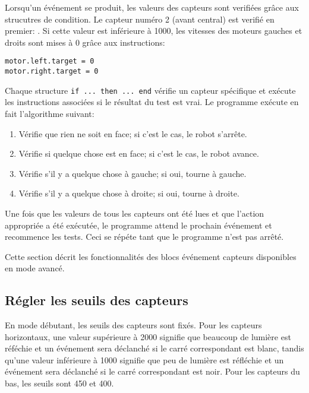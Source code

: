 Lorsqu'un événement se produit, les valeurs des capteurs sont verifiées grâce aux strucutres de condition.
Le capteur numéro 2 (avant central) est verifié en premier: .
Si cette valeur est inférieure à 1000, les vitesses des moteurs gauches et droits sont mises à 0
grâce aux instructions:

\begin{footnotesize}
\begin{verbatim}
motor.left.target = 0
motor.right.target = 0
\end{verbatim}
\end{footnotesize}

Chaque structure \verb+if ... then ... end+ vérifie un capteur spécifique et exécute les instructions
associées si le résultat du test est vrai.
Le programme exécute en fait l'algorithme suivant:

\begin{enumerate}[start=0,noitemsep,nosep]
\item Vérifie que rien ne soit en face; si c'est le cas, le robot s'arrête.
\item Vérifie si quelque chose est en face; si c'est le cas, le robot avance.
\item Vérifie s'il y a quelque chose à gauche; si oui, tourne à gauche.
\item Vérifie s'il y a quelque chose à droite; si oui, tourne à droite.
\end{enumerate}

Une fois que les valeurs de tous les capteurs ont été lues et que l'action appropriée a été exécutée,
le programme attend le prochain événement  et recommence les tests.
Ceci se répéte tant que le programme n'est pas arrêté.





Cette section décrit les fonctionnalités des blocs événement capteurs disponibles en mode avancé.

\subsection*{Régler les seuils des capteurs}

En mode débutant, les seuils des capteurs sont fixés.
Pour les capteurs horizontaux, une valeur supérieure à 2000 signifie que beaucoup de lumière
est réféchie et un événement sera déclanché si le carré correspondant est blanc,
tandis qu'une valeur inférieure à 1000 signifie que peu de lumière est réfléchie 
et un événement sera déclanché si le carré correspondant est noir.
Pour les capteurs du bas, les seuils sont 450 et 400.

